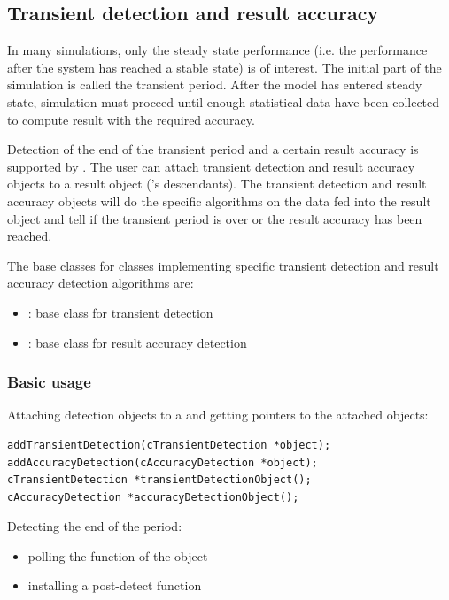 \subsection{Transient detection and result accuracy}

In many simulations, only the steady state performance (i.e.
the performance after the system has reached a stable state)
is of interest. The initial part of the simulation is called
the transient period. After the model has entered steady state,
simulation must proceed until enough statistical data have been
collected to compute result with the required accuracy.


Detection of the end of the transient period and a certain result
accuracy is supported by {\opp}. The user can attach transient
detection and result accuracy objects to a result object ('s
descendants). The transient detection and result accuracy objects will
do the specific algorithms on the data fed into the result object and
tell if the transient period is over or the result accuracy has been
reached.

The base classes for classes implementing specific transient
detection and result accuracy detection algorithms are:
\begin{itemize}
\item{: base class for transient detection}
\item{: base class for result accuracy detection}
\end{itemize}


\subsubsection{Basic usage}

%
%

Attaching detection objects to a  and getting pointers
to the attached objects:

\begin{verbatim}
addTransientDetection(cTransientDetection *object);
addAccuracyDetection(cAccuracyDetection *object);
cTransientDetection *transientDetectionObject();
cAccuracyDetection *accuracyDetectionObject();
\end{verbatim}


Detecting the end of the period:
\begin{itemize}
\item{polling the  function of the object}
\item{installing a post-detect function}
\end{itemize}


